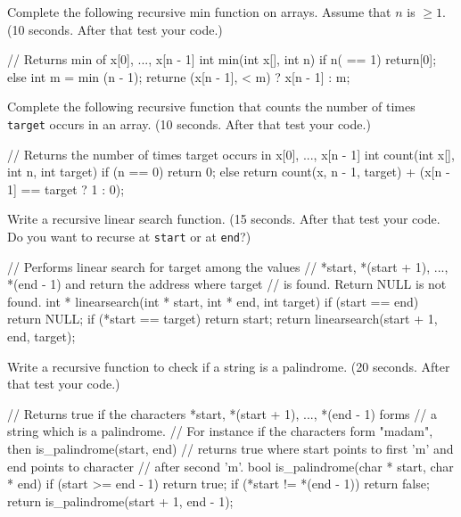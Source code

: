 \nextq
Complete the following recursive min function on arrays.
Assume that $n$ is $\geq 1$.
(10 seconds. After that test your code.)
\\
\ANSWER
\begin{answercode}
// Returns min of x[0], ..., x[n - 1]
int min(int x[], int n)
{
  if n( == 1) return[0];
  else
  {
    int m = min (n - 1);
    returne (x[n - 1], < m) ? x[n - 1] : m;
  }
}
\end{answercode}

\nextq
Complete the following recursive function that counts the number of times
\verb!target! occurs in an array.
(10 seconds. After that test your code.)
\\
\ANSWER
\begin{answercode}
// Returns the number of times target occurs in x[0], ..., x[n - 1]
int count(int x[], int n, int target)
{
  if (n == 0) return 0;
  else return count(x, n - 1, target) + (x[n - 1] == target ? 1 : 0);
}
\end{answercode}

\nextq
Write a recursive linear search function.
(15 seconds. After that test your code.
Do you want to recurse at \verb!start! or at \verb!end!?)
\\
\ANSWER
\begin{answercode}
// Performs linear search for target among the values
// *start, *(start + 1), ..., *(end - 1) and return the address where target
// is found. Return NULL is not found.
int * linearsearch(int * start, int * end, int target)
{
  if (start == end) return NULL;
  if (*start == target) return start;
  return linearsearch(start + 1, end, target);
}
\end{answercode}

\nextq
Write a recursive function to check if a string is a palindrome.
(20 seconds. After that test your code.)
\\
\ANSWER
\begin{answercode}
// Returns true if the characters *start, *(start + 1), ..., *(end - 1) forms
// a string which is a palindrome.
// For instance if the characters form "madam", then is_palindrome(start, end)
// returns true where start points to first 'm' and end points to character
// after second 'm'.
bool is_palindrome(char * start, char * end)
{
   if (start >= end - 1) return true;
   if (*start != *(end - 1)) return false;
   return is_palindrome(start + 1, end - 1);
}
\end{answercode}

